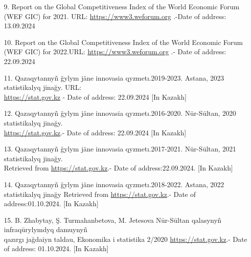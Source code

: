 \begin{references}
9. Report on the Global Competitiveness Index of the World Economic
Forum (WEF GIC) for 2021. URL:
\href{https://www3.weforum.org/docs/WEF_Annual_Report_2020_21.pdf}{https://www3.weforum.org} .-Date
of address: 13.09.2024

10. Report on the Global Competitiveness Index of the World Economic
Forum (WEF GIC) for 2022.URL:
\href{https://www3.weforum.org/docs/WEF_Annual_Report_2021_22.pdf}{https://www3.weforum.org} .- Date
of address: 22.09.2024

11. Qazaqytannyñ ğylym jäne innovasia qyzmetı.2019-2023. Astana, 2023
statistikalyq jinağy. URL:\\
\href{https://stat.gov.kz/upload/iblock/226/1i3i3s3o3tuvvsquto0ujj0usfnji43c/\%D0\%A1-05-\%D0\%93\%20(\%D0\%BA\%D0\%B0\%D0\%B7).pdf}{https://stat.gov.kz}
- Date of address: 22.09.2024 {[}In Kazakh{]}

12. Qazaqytannyñ ğylym jäne innovasia qyzmetı.2016-2020. Nūr-Sūltan,
2020 statistikalyq jinağy.\\
\href{https://stat.gov.kz/publication/collections/?year=2020&name=16307&period=year}{https://stat.gov.kz}.-
Date of address: 22.09.2024 {[}In Kazakh{]}

13. Qazaqytannyñ ğylym jäne innovasia qyzmetı.2017-2021. Nūr-Sūltan,
2021 statistikalyq jinağy. \\Retrieved from
\href{https://stat.gov.kz/publication/collections/?year=2021&name=16307&period}{https://stat.gov.kz}.-
Date of address:22.09.2024. {[}In Kazakh{]}

14. Qazaqytannyñ ğylym jäne innovasia qyzmetı.2018-2022. Astana, 2022
statistikalyq jinağy Retrieved from
\href{https://stat.gov.kz/upload/iblock/e4a/5014j9iccdo5z0witso6spfpdbhx49ra/\%D0\%A1-10-\%D0\%93\%20(\%D0\%BA\%D0\%B0\%D0\%B7-\%D1\%80\%D1\%83\%D1\%81\%D1\%81).pdf}{https://stat.gov.kz}.-
Date of address:01.10.2024. {[}In Kazakh{]}

15. B. Zhabytay, Ş. Turmahanbetova, M. Jetesova Nūr-Sūltan qalasynyñ
infraqūrylymdyq damuynyñ \\qazırgı jağdaiyn taldau, Ekonomika i statistika
2/2020
\href{https://stat.gov.kz/upload/iblock/734/vh3mvklrnbsb6iluk2319fjas4sqcmn0/\%D0\%AD\%D0\%B8\%D0\%A1\%202\%202020.pdf}{https://stat.gov.kz}.-
Date of address: 01.10.2024. {[}In Kazakh{]}
\end{references}

